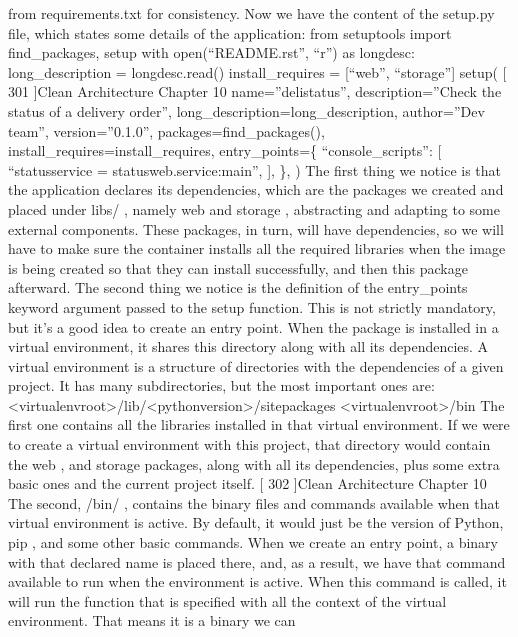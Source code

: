 \documentclass[a4paper,10pt,english]{sphinxmanual}
\begin{document}
from requirements.txt for consistency.
Now we have the content of the setup.py file, which states some details of the application:
from setuptools import find\_packages, setup
with open(“README.rst”, “r”) as longdesc:
long\_description = longdesc.read()
install\_requires = {[}“web”, “storage”{]}
setup(
{[} 301 {]}Clean Architecture
Chapter 10
name=”delistatus”,
description=”Check the status of a delivery order”,
long\_description=long\_description,
author=”Dev team”,
version=”0.1.0”,
packages=find\_packages(),
install\_requires=install\_requires,
entry\_points=\{
“console\_scripts”: {[}
“status\sphinxhyphen{}service = statusweb.service:main”,
{]},
\},
)
The first thing we notice is that the application declares its dependencies, which are the
packages we created and placed under libs/ , namely web and storage , abstracting and
adapting to some external components. These packages, in turn, will have dependencies, so
we will have to make sure the container installs all the required libraries when the image is
being created so that they can install successfully, and then this package afterward.
The second thing we notice is the definition of the entry\_points keyword argument
passed to the setup function. This is not strictly mandatory, but it’s a good idea to create an
entry point. When the package is installed in a virtual environment, it shares this directory
along with all its dependencies. A virtual environment is a structure of directories with the
dependencies of a given project. It has many subdirectories, but the most important ones
are:
\textless{}virtual\sphinxhyphen{}env\sphinxhyphen{}root\textgreater{}/lib/\textless{}python\sphinxhyphen{}version\textgreater{}/site\sphinxhyphen{}packages
\textless{}virtual\sphinxhyphen{}env\sphinxhyphen{}root\textgreater{}/bin
The first one contains all the libraries installed in that virtual environment. If we were to
create a virtual environment with this project, that directory would contain the web ,
and storage packages, along with all its dependencies, plus some extra basic ones and the
current project itself.
{[} 302 {]}Clean Architecture
Chapter 10
The second, /bin/ , contains the binary files and commands available when that virtual
environment is active. By default, it would just be the version of Python, pip , and some
other basic commands. When we create an entry point, a binary with that declared name is
placed there, and, as a result, we have that command available to run when the
environment is active. When this command is called, it will run the function that is
specified with all the context of the virtual environment. That means it is a binary we can
\end{document}
